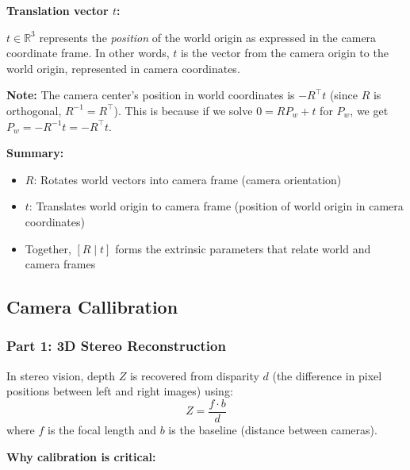 \documentclass[11pt]{article}
\begin{document}
\textbf{Translation vector $t$:}

$t \in \mathbb{R}^3$ represents the \textit{position} of the world origin as expressed in the camera coordinate frame. In other words, $t$ is the vector from the camera origin to the world origin, represented in camera coordinates.

\textbf{Note:} The camera center's position in world coordinates is $-R^\top t$ (since $R$ is orthogonal, $R^{-1} = R^\top$). This is because if we solve $0 = R P_w + t$ for $P_w$, we get $P_w = -R^{-1} t = -R^\top t$.

\textbf{Summary:}
\begin{itemize}
    \item $R$: Rotates world vectors into camera frame (camera orientation)
    \item $t$: Translates world origin to camera frame (position of world origin in camera coordinates)
    \item Together, $[R \mid t]$ forms the extrinsic parameters that relate world and camera frames
\end{itemize}

\subsection{Camera Callibration}
\subsubsection*{Part 1: 3D Stereo Reconstruction}
In stereo vision, depth $Z$ is recovered from disparity $d$ (the difference in pixel positions between left and right images) using:
\[
Z = \frac{f \cdot b}{d}
\]
where $f$ is the focal length and $b$ is the baseline (distance between cameras).

\textbf{Why calibration is critical:}
\end{document}

